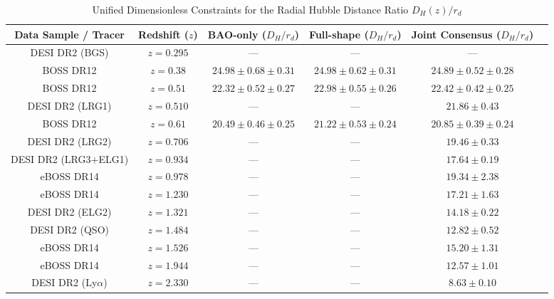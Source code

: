 \documentclass{book}
\begin{document}
	\begin{table}[h!]
		\centering
		\footnotesize
		\begin{tabular}{cccccc}
			\hline\hline
			Data Sample / Tracer & Redshift ($z$) & BAO-only ($D_H/r_d$) & Full-shape ($D_H/r_d$) & Joint Consensus ($D_H/r_d$) \\ \hline
			DESI DR2 (BGS)        & $z = 0.295$ & — & — & — \\
			BOSS DR12             & $z = 0.38$  & $24.98 \pm 0.68 \pm 0.31$ & $24.98 \pm 0.62 \pm 0.31$ & $24.89 \pm 0.52 \pm 0.28$ \\
			BOSS DR12             & $z = 0.51$  & $22.32 \pm 0.52 \pm 0.27$ & $22.98 \pm 0.55 \pm 0.26$ & $22.42 \pm 0.42 \pm 0.25$ \\
			DESI DR2 (LRG1)       & $z = 0.510$ & — & — & $21.86 \pm 0.43$ \\
			BOSS DR12             & $z = 0.61$  & $20.49 \pm 0.46 \pm 0.25$ & $21.22 \pm 0.53 \pm 0.24$ & $20.85 \pm 0.39 \pm 0.24$ \\
			DESI DR2 (LRG2)       & $z = 0.706$ & — & — & $19.46 \pm 0.33$ \\
			DESI DR2 (LRG3+ELG1)  & $z = 0.934$ & — & — & $17.64 \pm 0.19$ \\
			eBOSS DR14            & $z = 0.978$ & — & — & $19.34 \pm 2.38$ \\
			eBOSS DR14            & $z = 1.230$ & — & — & $17.21 \pm 1.63$ \\
			DESI DR2 (ELG2)       & $z = 1.321$ & — & — & $14.18 \pm 0.22$ \\
			DESI DR2 (QSO)        & $z = 1.484$ & — & — & $12.82 \pm 0.52$ \\
			eBOSS DR14            & $z = 1.526$ & — & — & $15.20 \pm 1.31$ \\
			eBOSS DR14            & $z = 1.944$ & — & — & $12.57 \pm 1.01$ \\
			DESI DR2 (Ly$\alpha$) & $z = 2.330$ & — & — & $8.63 \pm 0.10$ \\ \hline\hline
		\end{tabular}
		\normalsize
		\caption{Unified Dimensionless Constraints for the Radial Hubble Distance Ratio $D_H(z)/r_d$}
		\label{tab:BAO_H_dimensionless}
	\end{table}
\end{document}
